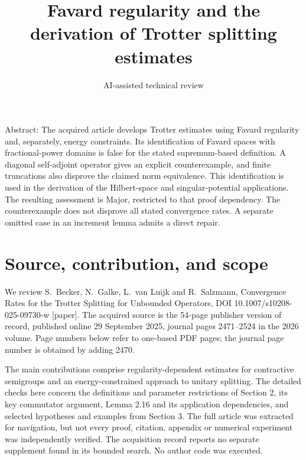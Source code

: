 \documentclass[10pt]{article}
\title{Favard regularity and the derivation of Trotter splitting estimates}
\author{AI-assisted technical review}
\date{}
\begin{document}
\maketitle
Abstract: The acquired article develops Trotter estimates using Favard regularity and, separately, energy constraints. Its identification of Favard spaces with fractional-power domains is false for the stated supremum-based definition. A diagonal self-adjoint operator gives an explicit counterexample, and finite truncations also disprove the claimed norm equivalence. This identification is used in the derivation of the Hilbert-space and singular-potential applications. The resulting assessment is Major, restricted to that proof dependency. The counterexample does not disprove all stated convergence rates. A separate omitted case in an increment lemma admits a direct repair.\par
\section*{Source, contribution, and scope}
We review S. Becker, N. Galke, L. van Luijk and R. Salzmann, Convergence Rates for the Trotter Splitting for Unbounded Operators, DOI 10.1007/s10208-025-09730-w [paper]. The acquired source is the 54-page publisher version of record, published online 29 September 2025, journal pages 2471–2524 in the 2026 volume. Page numbers below refer to one-based PDF pages; the journal page number is obtained by adding 2470.\par
The main contributions comprise regularity-dependent estimates for contractive semigroups and an energy-constrained approach to unitary splitting. The detailed checks here concern the definitions and parameter restrictions of Section 2, its key commutator argument, Lemma 2.16 and its application dependencies, and selected hypotheses and examples from Section 3. The full article was extracted for navigation, but not every proof, citation, appendix or numerical experiment was independently verified. The acquisition record reports no separate supplement found in its bounded search. No author code was executed.\par
\end{document}

